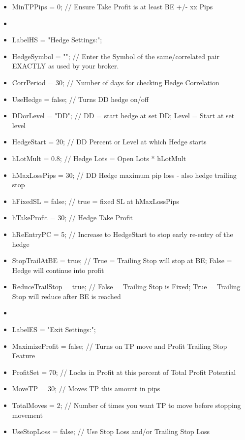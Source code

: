 \begin{itemize}
\item MinTPPips           = 0;        // Ensure Take Profit is at least BE +/- xx Pips
\item 
\item LabelHS             = "Hedge Settings:";
\item HedgeSymbol         = "";       // Enter the Symbol of the same/correlated pair EXACTLY as used by your broker.
\item CorrPeriod          = 30;       // Number of days for checking Hedge Correlation
\item UseHedge            = false;    // Turns DD hedge on/off
\item DDorLevel           = "DD";     // DD = start hedge at set DD; Level = Start at set level
\item HedgeStart          = 20;       // DD Percent or Level at which Hedge starts
\item hLotMult            = 0.8;      // Hedge Lots = Open Lots * hLotMult
\item hMaxLossPips        = 30;       // DD Hedge maximum pip loss - also hedge trailing stop
\item hFixedSL            = false;    // true = fixed SL at hMaxLossPips
\item hTakeProfit         = 30;       // Hedge Take Profit
\item hReEntryPC          = 5;        // Increase to HedgeStart to stop early re-entry of the hedge
\item StopTrailAtBE       = true;     // True = Trailing Stop will stop at BE; False = Hedge will continue into profit
\item ReduceTrailStop     = true;     // False = Trailing Stop is Fixed; True = Trailing Stop will reduce after BE is reached
\item 
\item LabelES             = "Exit Settings:";
\item MaximizeProfit      = false;    // Turns on TP move and Profit Trailing Stop Feature
\item ProfitSet           = 70;       // Locks in Profit at this percent of Total Profit Potential
\item MoveTP              = 30;       // Moves TP this amount in pips
\item TotalMoves          = 2;        // Number of times you want TP to move before stopping movement
\item UseStopLoss         = false;    // Use Stop Loss and/or Trailing Stop Loss

\end{itemize}
